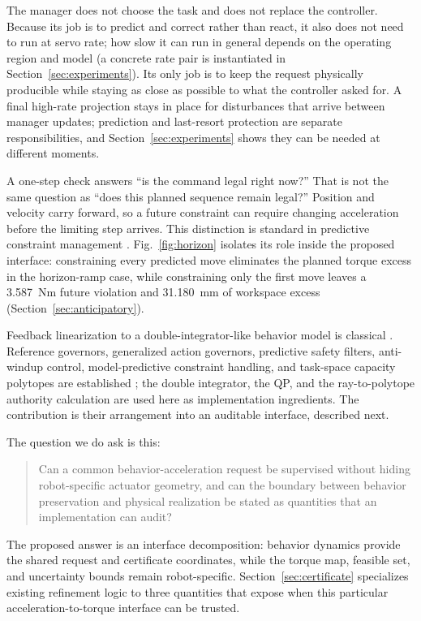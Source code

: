 \documentclass[journal]{IEEEtran}
\begin{document}
The manager does not choose the task and does not replace the controller. Because its job is to predict and correct rather than react, it also does not need to run at servo rate; how slow it can run in general depends on the operating region and model (a concrete rate pair is instantiated in Section~\ref{sec:experiments}). Its only job is to keep the request physically producible while staying as close as possible to what the controller asked for. A final high-rate projection stays in place for disturbances that arrive between manager updates; prediction and last-resort protection are separate responsibilities, and Section~\ref{sec:experiments} shows they can be needed at different moments.

A one-step check answers ``is the command legal right now?'' That is not the same question as ``does this planned sequence remain legal?'' Position and velocity carry forward, so a future constraint can require changing acceleration before the limiting step arrives. This distinction is standard in predictive constraint management \cite{r3,r5,r16,r17,r18}. Fig.~\ref{fig:horizon} isolates its role inside the proposed interface: constraining every predicted move eliminates the planned torque excess in the horizon-ramp case, while constraining only the first move leaves a 3.587~Nm future violation and 31.180~mm of workspace excess (Section~\ref{sec:anticipatory}).

Feedback linearization to a double-integrator-like behavior model is classical \cite{r1,r2}. Reference governors, generalized action governors, predictive safety filters, anti-windup control, model-predictive constraint handling, and task-space capacity polytopes are established \cite{r3,r4,r5,r6,r7,r16,r17,r18,r19,r20}; the double integrator, the QP, and the ray-to-polytope authority calculation are used here as implementation ingredients. The contribution is their arrangement into an auditable interface, described next.

The question we do ask is this:

\begin{quote}
Can a common behavior-acceleration request be supervised without hiding robot-specific actuator geometry, and can the boundary between behavior preservation and physical realization be stated as quantities that an implementation can audit?
\end{quote}

The proposed answer is an interface decomposition: behavior dynamics provide the shared request and certificate coordinates, while the torque map, feasible set, and uncertainty bounds remain robot-specific. Section~\ref{sec:certificate} specializes existing refinement logic \cite{r8,r9,r19} to three quantities that expose when this particular acceleration-to-torque interface can be trusted.
\end{document}
